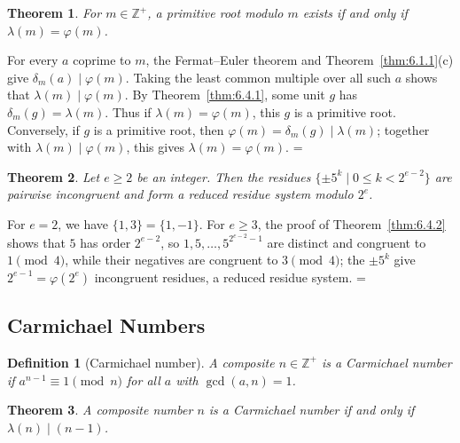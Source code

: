 \documentclass[11pt]{article}
\makeatletter
\let\nt@closedisplay\]
\def\nt@guardedclose{\@ifnextchar\par{\nt@closeafterpar}{\@ifnextchar\end{\postdisplaypenalty\@M\nt@closedisplay}{\nt@closedisplay}}}
\def\nt@closeafterpar\par{\@ifnextchar\par{\nt@closeafterpar}{\@ifnextchar\end{\postdisplaypenalty\@M\nt@closedisplay\par}{\nt@closedisplay\par}}}
\renewenvironment{proof}[1][\proofname]{\par
  \pushQED{\qed}\normalfont\topsep\medskipamount\edef\nt@afterproof{\@endparpenalty=\the\@endparpenalty\relax}\@beginparpenalty\@M\@endparpenalty\@M\let\]\nt@guardedclose\trivlist\item[]\textit{#1\@addpunct{.}} \ignorespaces}{\ifvmode\addpenalty\@M\fi\popQED\nt@afterproof\endtrivlist\@endpefalse}
\theoremstyle{ntstyle}
\newtheorem{theorem}{Theorem}[subsection]
\newtheorem{definition}{Definition}[subsection]
\makeatother
\begin{document}
\begin{theorem}\label{thm:6.4.3} For $m\in\mathbb{Z}^+$, a primitive root modulo $m$ exists
  if and only if $\lambda(m) = \varphi(m)$.

\end{theorem}

\begin{proof} For every $a$ coprime to $m$, the Fermat--Euler theorem and
  Theorem~\ref{thm:6.1.1}(c) give
  $\delta_m(a)\mid\varphi(m)$. Taking the least common multiple over all
  such $a$ shows that $\lambda(m)\mid\varphi(m)$. By
  Theorem~\ref{thm:6.4.1}, some unit $g$ has
  $\delta_m(g)=\lambda(m)$. Thus if $\lambda(m)=\varphi(m)$, this $g$ is
  a primitive root. Conversely, if $g$ is a primitive root, then
  $\varphi(m)=\delta_m(g)\mid\lambda(m)$; together with
  $\lambda(m)\mid\varphi(m)$, this gives $\lambda(m)=\varphi(m)$.
\end{proof}

\begin{theorem}\label{thm:6.4.4} Let $e \ge 2$ be an integer. Then the residues
  $\{\pm5^k \mid 0\le k<2^{e-2}\}$ are pairwise incongruent and form a reduced
  residue system modulo $2^{e}$.

\end{theorem}

\begin{proof} For $e = 2$, we have $\{1, 3\} = \{1, -1\}$. For $e \ge 3$, the proof of Theorem~\ref{thm:6.4.2} shows that $5$ has
  order $2^{e-2}$, so $1, 5, \ldots, 5^{2^{e-2}-1}$ are distinct and congruent to $1 \pmod{4}$, while their negatives are
  congruent to $3 \pmod{4}$; the $\pm 5^{k}$ give $2^{e-1} = \varphi(2^{e})$
  incongruent residues, a reduced residue system.
\end{proof}
\subsection{Carmichael Numbers}

\begin{definition}[Carmichael number]\label{def:6.5.1}\label{def:carmichael-number}
  A composite
  $n \in \mathbb{Z}^+$ is a Carmichael number if $a^{n-1} \equiv 1 \pmod{n}$ for all $a$ with $\gcd(a, n) = 1$.

\end{definition}

\begin{theorem}\label{thm:6.5.1} A composite number $n$ is a
  Carmichael number if and only if $\lambda(n) \mid (n-1)$.

\end{theorem}
\end{document}
